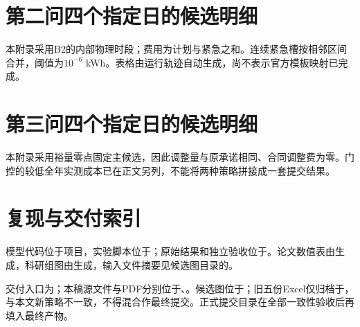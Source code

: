 \documentclass[UTF8,a4paper,zihao=-4,fontset=fandol]{ctexart}
\begin{document}
\appendix
\section{第二问四个指定日的候选明细}
本附录采用B2的内部物理时段；费用为计划与紧急之和。连续紧急槽按相邻区间合并，阈值为$10^{-6}$ kWh。表格由运行轨迹自动生成，尚不表示官方模板映射已完成。

\section{第三问四个指定日的候选明细}
本附录采用裕量零点固定主候选，因此调整量与原承诺相同、合同调整费为零。门控的较低全年实测成本已在正文另列，不能将两种策略拼接成一套提交结果。

\section{复现与交付索引}
模型代码位于项目，实验脚本位于；原始结果和独立验收位于。论文数值表由生成，科研组图由生成，输入文件摘要见候选图目录的。

交付入口为；本稿源文件与PDF分别位于、。候选图位于；旧五份Excel仅归档于，与本文新策略不一致，不得混合作最终提交。正式提交目录在全部一致性验收后再填入最终产物。
\end{document}
